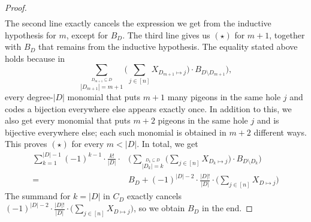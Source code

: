 \documentclass[10pt,a4paper]{article}
\begin{document}
\begin{proof}
\begin{align*}
	\end{align*}	
	The second line exactly cancels the expression we get from the inductive hypothesis for $m$, except for $B_D$. The third line gives us $(\star)$ for $m+1$, together with $B_D$ that remains from the inductive hypothesis. The equality stated above holds because in
	\[
	\sum_{\stackrel{D_{m+1} \subseteq D}{|D_{m+1}| = m+1}} \Big(\sum_{j \in [n]} X_{D_{m+1} \mapsto j}\Big) \cdot B_{D \setminus D_{m+1}} \Big),
	\]
	every degree-$|D|$ monomial that puts $m+1$ many pigeons in the same hole $j$ and codes a bijection everywhere else appears exactly once. In addition to this, we also get every monomial that puts $m+2$ pigeons in the same hole $j$ and is bijective everywhere else; each such monomial is obtained in $m+2$ different ways. This proves $(\star)$ for every $m < |D|$.
	In total, we get
	\begin{align*}
		\sum_{k=1}^{|D|-1} (-1)^{k-1} \cdot \frac{k!}{|D|} \cdot &\Big(\sum_{\stackrel{D_k \subseteq D}{|D_k| = k}} \Big(\sum_{j \in [n]} X_{D_k \mapsto j}\Big) \cdot B_{D \setminus D_k} \Big)\\
		= &B_D + (-1)^{|D|-2} \cdot \frac{|D|!}{|D|} \cdot \Big(\sum_{j \in [n]} X_{D \mapsto j}\Big)  
	\end{align*}	   
	The summand for $k = |D|$ in $C_D$ exactly cancels $(-1)^{|D|-2} \cdot \frac{|D|!}{|D|} \cdot \Big(\sum_{j \in [n]} X_{D \mapsto j}\Big)$, so we obtain $B_D$ in the end.
\end{proof}	
\end{document}

